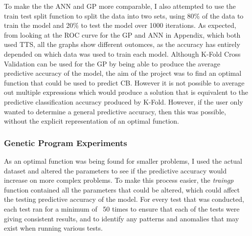 \documentclass[11pt]{article}
\begin{document}
To make the the ANN and GP more comparable, I also attempted to use the train test split function to split the data into two sets, using 80\% of the data to train the model and 20\% to test the model over 1000 iterations.  As expected, from looking at the ROC curve for the GP and ANN in Appendix, which both used TTS, all the graphs show different outomces, as the accuracy has entirely depended on which data was used to train each model. 
Although K-Fold Cross Validation can be used for the GP by being able to produce the average predictive accuracy of the model, the aim of the project was to find an optimal function that could be used to predict CB. However it is not possible to average out multiple expressions which would produce a solution that is equivalent to the predictive classification accuracy produced by K-Fold. However, if the user only wanted to determine a general predictive accuracy, then this was possible, without the explicit representation of an optimal function. 
\subsubsection{Genetic Program Experiments}\label{subsubsec:GPE}
As an optimal function was being found for smaller problems, I used the actual dataset and altered the parameters to see if the predictive accuracy would increase on more complex problems. To make this process easier, the \textit{train\textunderscore gp} function contained all the parameters that could be altered, which could affect the testing predictive accuracy of the model. For every test that was conducted, each test ran for a minimum of \
50 times to ensure that each of the tests were giving consistent results, and to identify any patterns and anomalies that may exist when running various tests.   \\
\end{document}
